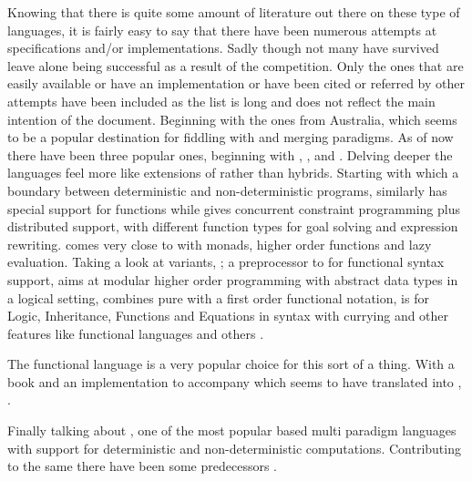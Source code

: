 \documentclass[thesis-solanki.tex]{subfiles}
\begin{document}
Knowing that there is quite some amount of literature out there on these type of languages, it is fairly easy to say that there have been numerous 
attempts at specifications and/or implementations. Sadly though not many have survived leave alone being successful as a result of the competition. 
Only the ones that are easily available or have an implementation or have been cited or referred by other attempts have been included as the list is long 
and does not reflect the main intention of the document. Beginning with the ones from Australia, which seems to be a popular destination for fiddling 
with  and merging paradigms. As of now there have been three popular ones, beginning with , 
\cite{website:nue-prolog},  \cite{website:oz-mozart} and  \cite{website:mercury}. 
Delving deeper the languages feel more like extensions of  rather than hybrids. Starting with  which a boundary 
between deterministic and non-deterministic programs, similarly  has special support for functions while  gives  
concurrent constraint programming plus distributed support, with different function types for goal solving and expression rewriting.   
\cite{lloyd1999programming:escher} comes very close to  with monads, higher order functions and lazy evaluation. Taking a look at 
 variants,  \cite{website:ciao}; a preprocessor to  for functional syntax support,  \cite{website:lambda-prolog} aims at modular higher order programming with abstract data types in a logical setting,  \cite{
website:babel,moreno1992logic, moreno1988babel} combines pure  with a first order functional notation,  \cite{
website:life} is for  Logic, Inheritance, Functions and Equations in  syntax with currying and other features like functional languages 
and others \cite{bert1987lpg,malachi1984tablog}.

The functional language  is a very popular choice for this sort of a thing. With a book \cite{friedman05reasoned} and an implementation to accompany \cite{website:kanren,website:minkanren} which seems to have translated into , 
\cite{website:haskellkanren,website:molog,website:minikanrent}. 

Finally talking about , one of the most popular  based multi paradigm languages with support for deterministic and non-deterministic computations. Contributing to the same there have been some predecessors \cite{website:alf,website:toy}.       
\end{document}
